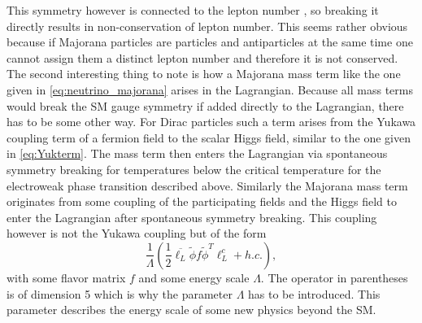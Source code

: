 This symmetry however is connected to the lepton number \cite[p. 14]{Bernreuther:2002uj}, so breaking it directly results in non-conservation of lepton number. This seems rather obvious because if Majorana particles are particles and antiparticles at the same time one cannot assign them a distinct lepton number and therefore it is not conserved. \newline \indent
The second interesting thing to note is how a Majorana mass term like the one given in \eqref{eq:neutrino_majorana} arises in the Lagrangian. Because all mass terms would break the SM gauge symmetry if added directly to the Lagrangian, there has to be some other way. For Dirac particles such a term arises from the Yukawa coupling term of a fermion field to the scalar Higgs field, similar to the one given in \eqref{eq:Yukterm}. The mass term then enters the Lagrangian via spontaneous symmetry breaking for temperatures below the critical temperature for the electroweak phase transition described above. Similarly the Majorana mass term originates from some coupling of the participating fields and the Higgs field to enter the Lagrangian after spontaneous symmetry breaking. This coupling however is not the Yukawa coupling but of the form \cite[Eq. (5)]{Drewes:2013gca}
\begin{equation}
	\frac{1}{\Lambda}\left(\frac{1}{2}\overline{\ell_L}\tilde{\phi}f\tilde{\phi}^T\ell^c_L+h.c.\right),
\end{equation}
with some flavor matrix $f$ and some energy scale $\Lambda$. The operator in parentheses is of dimension 5 which is why the parameter $\Lambda$ has to be introduced. This parameter describes the energy scale of some new physics beyond the SM.
